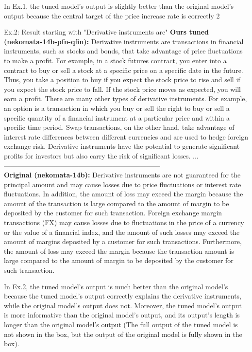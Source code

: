 In Ex.1, the tuned model's output is slightly better than the original model's output because the central target of the price increase rate is correctly 2\
\begin{brekableitembox}{Ex.2: Result starting with "Derivative instruments are"}
    {\bf Ours tuned (nekomata-14b-pfn-qfin):}
    Derivative instruments are transactions in financial instruments, such as stocks and bonds, that take advantage of price fluctuations to make a profit. For example, in a stock futures contract, you enter into a contract to buy or sell a stock at a specific price on a specific date in the future. Thus, you take a position to buy if you expect the stock price to rise and sell if you expect the stock price to fall. If the stock price moves as expected, you will earn a profit.
    There are many other types of derivative instruments. For example, an option is a transaction in which you buy or sell the right to buy or sell a specific quantity of a financial instrument at a particular price and within a specific time period. Swap transactions, on the other hand, take advantage of interest rate differences between different currencies and are used to hedge foreign exchange risk.
    Derivative instruments have the potential to generate significant profits for investors but also carry the risk of significant losses. ...\\
    ---------------------------------------------------------------------\\
    {\bf Original (nekomata-14b):}
    Derivative instruments are not guaranteed for the principal amount and may cause losses due to price fluctuations or interest rate fluctuations. In addition, the amount of loss may exceed the margin because the amount of the transaction is large compared to the amount of margin to be deposited by the customer for such transaction.
    Foreign exchange margin transactions (FX) may cause losses due to fluctuations in the price of a currency or the value of a financial index, and the amount of such losses may exceed the amount of margins deposited by a customer for such transactions. Furthermore, the amount of loss may exceed the margin because the transaction amount is large compared to the amount of margin to be deposited by the customer for such transaction.
\end{brekableitembox}

In Ex.2, the tuned model's output is much better than the original model's because the tuned model's output correctly explains the derivative instruments, while the original model's output does not.
Moreover, the tuned model's output is more informative than the original model's output, and its output's length is longer than the original model's output (The full output of the tuned model is not shown in the box, but the output of the original model is fully shown in the box).

